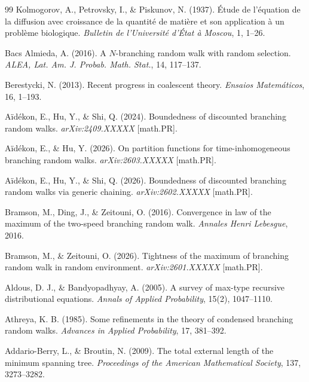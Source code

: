 \begin{thebibliography}{99}
Kolmogorov, A., Petrovsky, I., \& Piskunov, N. (1937). Étude de l'équation de la diffusion avec croissance de la quantité de matière et son application à un problème biologique. \textit{Bulletin de l'Université d'État à Moscou}, 1, 1--26.

Bacs Almieda, A. (2016). A $N$-branching random walk with random selection. \textit{ALEA, Lat. Am. J. Probab. Math. Stat.}, 14, 117--137.

Berestycki, N. (2013). Recent progress in coalescent theory. \textit{Ensaios Matemáticos}, 16, 1--193.

Aïdékon, E., Hu, Y., \& Shi, Q. (2024). Boundedness of discounted branching random walks. \textit{arXiv:2409.XXXXX} [math.PR].

Aïdékon, E., \& Hu, Y. (2026). On partition functions for time-inhomogeneous branching random walks. \textit{arXiv:2603.XXXXX} [math.PR].

Aïdékon, E., Hu, Y., \& Shi, Q. (2026). Boundedness of discounted branching random walks via generic chaining. \textit{arXiv:2602.XXXXX} [math.PR].

Bramson, M., Ding, J., \& Zeitouni, O. (2016). Convergence in law of the maximum of the two-speed branching random walk. \textit{Annales Henri Lebesgue}, 2016.

Bramson, M., \& Zeitouni, O. (2026). Tightness of the maximum of branching random walk in random environment. \textit{arXiv:2601.XXXXX} [math.PR].

Aldous, D. J., \& Bandyopadhyay, A. (2005). A survey of max-type recursive distributional equations. \textit{Annals of Applied Probability}, 15(2), 1047--1110.

Athreya, K. B. (1985). Some refinements in the theory of condensed branching random walks. \textit{Advances in Applied Probability}, 17, 381--392.

Addario-Berry, L., \& Broutin, N. (2009). The total external length of the minimum spanning tree. \textit{Proceedings of the American Mathematical Society}, 137, 3273--3282.


\end{thebibliography}
